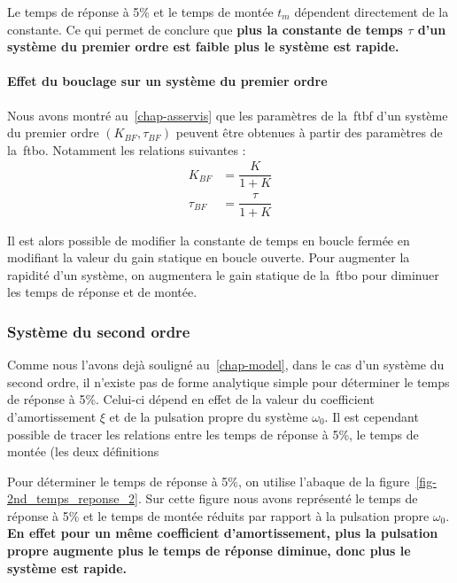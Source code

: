 Le temps de réponse à 5\% et le temps de montée $t_m$ dépendent 
directement de la constante. Ce qui permet de conclure que 
\textbf{plus la constante de temps $\tau$ d'un système du premier
ordre est faible plus le système est rapide.}

\paragraph{Effet du bouclage sur un système du premier ordre}
Nous avons montré au~\cref{chap-asservis} que les paramètres de 
la~\gls{ftbf} d'un système du premier ordre $(K_{BF},\tau_{BF})$ peuvent 
être obtenues à partir des paramètres de la~\gls{ftbo}. Notamment les relations
suivantes :
\begin{align*}
       K_{BF}&=\dfrac{K}{1+K}\\
    \tau_{BF}&=\dfrac{\tau}{1+K}
\end{align*}

Il est alors possible de modifier la constante de temps en boucle fermée en 
modifiant la valeur du gain statique en boucle ouverte. Pour augmenter
la rapidité d'un système, on augmentera le gain statique de la~\gls{ftbo} pour
diminuer les temps de réponse et de montée.

\subsubsection{Système du second ordre}
Comme nous l'avons dejà souligné au~\cref{chap-model}, dans le cas d'un système
du second ordre, il n'existe pas de forme analytique simple pour déterminer 
le temps de réponse à 5\%. Celui-ci dépend en effet de la valeur du coefficient 
d'amortissement $\xi$ et de la pulsation propre du système $\omega_0$.
Il est cependant possible de tracer les relations entre les temps de réponse
à 5\%, le temps de montée (les deux définitions 

Pour déterminer le temps de réponse à 5\%, on utilise l'abaque de la 
figure~\cref{fig-2nd_temps_reponse_2}. Sur cette figure nous avons représenté
le temps de réponse à 5\% et le temps de montée réduits par rapport à la
pulsation propre $\omega_0$. \textbf{En effet pour un même coefficient 
d'amortissement, plus la pulsation propre augmente plus le temps de réponse 
diminue, donc plus le système est rapide.}

